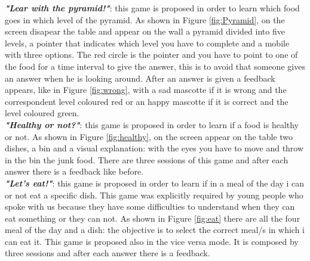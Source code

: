 \documentclass{sigchi-ext}
\begin{document}
\textit{\textbf{"Lear with the pyramid!"}}: this game is proposed in order to learn which food goes in which level of the pyramid. As shown in Figure \ref{fig:Pyramid}, on the screen disapear the table and appear on the wall a pyramid divided into five levels, a pointer that indicates which level you have to complete and a mobile with three options. The red circle is the pointer and you have to point to one of the food for a time interval to give the answer, this is to avoid that someone gives an answer when he is looking around. After an answer is given a feedback appears, like in Figure \ref{fig:wrong}, with a sad mascotte if it is wrong and the correspondent level coloured red or an happy mascotte if it is correct and the level coloured green.\\
\medskip
{}
\textit{\textbf{"Healthy or not?"}}: this game is proposed in order to learn if a food is healthy or not. As shown in Figure \ref{fig:healthy}, on the screen appear on the table two dishes, a bin and a visual explanation: with the eyes you have to move and throw in the bin the junk food. There are three sessions of this game and after each answer there is a feedback like before.\\
\medskip
\textit{\textbf{"Let's eat!"}}: this game is proposed in order to learn if in a meal of the day i can or not eat a specific dish. This game was explicitly required by young people who spoke with us because they have some difficulties to understand when they can eat something or they can not. As shown in Figure \ref{fig:eat} there are all the four meal of the day and a dish: the objective is to select the correct meal/s in which i can eat it. This game is proposed also in the vice versa mode. It is composed by three sessions and after each answer there is a feedback.\\
\end{document}
